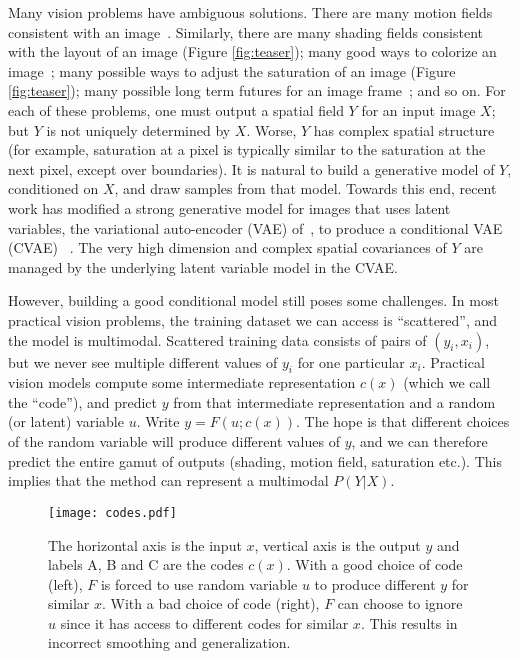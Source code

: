 \documentclass[10pt,twocolumn,letterpaper]{article}
\begin{document}
Many vision problems have ambiguous solutions.  There are many motion
fields consistent with an image~\cite{sohn2015learning,walker2016uncertain,xue2016visual}. 
Similarly, there are many shading fields consistent with the layout of an image 
(Figure \ref{fig:teaser}); many good ways to colorize an 
image~\cite{DivColor, UnsupDivColor, zhang2016colorful}; many possible ways to adjust 
the saturation of an image (Figure \ref{fig:teaser}); many possible long term futures for an image frame~\cite{zhou2016learning}; and
so on. For each of these problems, one must output  a spatial field $Y$ for an input image 
$X$; but $Y$ is not uniquely determined by $X$.   Worse, $Y$ has complex spatial 
structure (for example, saturation at a pixel is typically similar to the saturation at the 
next pixel, except over boundaries). It is natural to build a generative model 
of $Y$, conditioned on $X$, and draw samples from that model. Towards this end, recent 
work has modified a strong generative model for images that uses latent variables, the 
variational auto-encoder (VAE) of~\cite{kingma2013auto}, to produce a conditional VAE 
(CVAE) ~\cite{sohn2015learning,walker2016uncertain,xue2016visual}.  The very high 
dimension and complex spatial covariances of $Y$ are managed by the underlying 
latent variable model in the CVAE.  

However, building a good conditional model still poses some challenges.  In most practical vision
problems, the training dataset we can access is ``scattered'', and the model is multimodal. 
Scattered training data consists of pairs of $(y_i, x_i)$, but we never see multiple 
different values of $y_i$ for one particular $x_i$.  Practical vision models compute 
some intermediate representation $c(x)$ (which we call the ``code''), and predict 
$y$ from that intermediate representation and a random (or latent) variable 
$u$. Write $y=F(u; c(x))$.  The hope is that different choices of the random 
variable will produce different values of $y$, and we can therefore predict the entire 
gamut of outputs (shading, motion field, saturation etc.). This implies that the method 
can represent a multimodal $P(Y|X)$.

\begin{figure}[!t]
\centerline{  \texttt{[image: codes.pdf]}}
  \caption{The horizontal axis is the input $x$, vertical axis is the output $y$ and
  labels A, B and C are the codes $c(x)$. With a good choice of code (left), $F$ is 
  forced to use random variable $u$ to produce different $y$ for similar $x$. With a
  bad choice of code (right), $F$ can choose to ignore $u$ since it has access to 
  different codes for similar $x$. This results in incorrect smoothing and 
  generalization.}
  \label{codes}
\end{figure}
\end{document}
